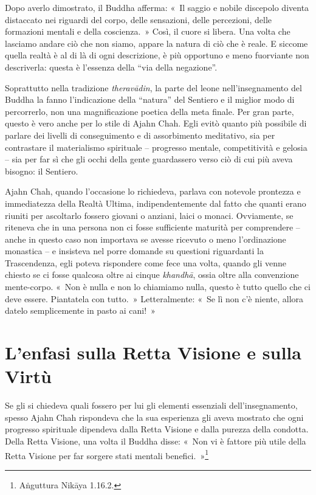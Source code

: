 Dopo averlo dimostrato, il Buddha afferma: «~Il saggio e nobile
discepolo diventa distaccato nei riguardi del corpo, delle sensazioni,
delle percezioni, delle formazioni mentali e della coscienza.~» Così, il
cuore si libera. Una volta che lasciamo andare ciò che non siamo, appare
la natura di ciò che è reale. E siccome quella realtà è al di là di ogni
descrizione, è più opportuno e meno fuorviante non descriverla: questa è
l'essenza della ``via della negazione''.

Soprattutto nella tradizione \emph{theravādin}, la parte del leone
nell'insegnamento del Buddha la fanno l'indicazione della ``natura'' del
Sentiero e il miglior modo di percorrerlo, non una magnificazione
poetica della meta finale. Per gran parte, questo è vero anche per lo
stile di Ajahn Chah. Egli evitò quanto più possibile di parlare dei
livelli di conseguimento e di assorbimento meditativo, sia per
contrastare il materialismo spirituale -- progresso mentale,
competitività e gelosia -- sia per far sì che gli occhi della gente
guardassero verso ciò di cui più aveva bisogno: il Sentiero.

Ajahn Chah, quando l'occasione lo richiedeva, parlava con notevole
prontezza e immediatezza della Realtà Ultima, indipendentemente dal
fatto che quanti erano riuniti per ascoltarlo fossero giovani o anziani,
laici o monaci. Ovviamente, se riteneva che in una persona non ci fosse
sufficiente maturità per comprendere -- anche in questo caso non
importava se avesse ricevuto o meno l'ordinazione monastica -- e
insisteva nel porre domande su questioni riguardanti la Trascendenza,
egli poteva rispondere come fece una volta, quando gli venne chiesto se
ci fosse qualcosa oltre ai cinque \emph{khandhā}, ossia oltre alla
convenzione mente-corpo. «~Non è nulla e non lo chiamiamo nulla, questo
è tutto quello che ci deve essere. Piantatela con tutto.~»
Letteralmente: «~Se lì non c'è niente, allora datelo semplicemente in
pasto ai cani!~»

\section{L'enfasi sulla Retta Visione e sulla Virtù}

Se gli si chiedeva quali fossero per lui gli elementi essenziali
dell'insegnamento, spesso Ajahn Chah rispondeva che la sua esperienza
gli aveva mostrato che ogni progresso spirituale dipendeva dalla Retta
Visione e dalla purezza della condotta. Della Retta Visione, una volta
il Buddha disse: «~Non vi è fattore più utile della Retta Visione per
far sorgere stati mentali benefici.~»\footnote{Aṅguttura Nikāya
  1.16.2.}


